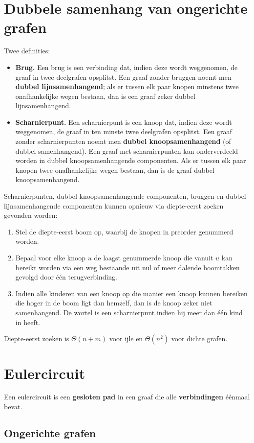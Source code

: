 



\section{Dubbele samenhang van ongerichte grafen}
Twee definities:
\begin{itemize}
	\item \textbf{Brug.} Een brug is een verbinding dat, indien deze wordt weggenomen, de graaf in twee deelgrafen opsplitst. Een graaf zonder bruggen noemt men \textbf{dubbel lijnsamenhangend}; als er tussen elk paar knopen minstens twee onafhankelijke wegen bestaan, dan is een graaf zeker dubbel lijnsamenhangend.
	\item \textbf{Scharnierpunt.} Een scharnierpunt is een knoop dat, indien deze wordt weggenomen, de graaf in ten minste twee deelgrafen opsplitst. Een graaf zonder scharnierpunten noemt men \textbf{dubbel knoopsamenhangend} (of dubbel samenhangend). Een graaf met scharnierpunten kan onderverdeeld worden in dubbel knoopsamenhangende componenten. Als er tussen elk paar knopen twee onafhankelijke wegen bestaan, dan is de graaf dubbel knoopsamenhangend.
\end{itemize}

Scharnierpunten, dubbel knoopsamenhangende componenten, bruggen en dubbel lijnsamenhangende componenten kunnen opnieuw via diepte-eerst zoeken gevonden worden:
\begin{enumerate}
	\item Stel de diepte-eerst boom op, waarbij de knopen in preorder genummerd worden. 
	\item Bepaal voor elke knoop $u$ de laagst genummerde knoop die vanuit $u$ kan bereikt worden via een weg bestaande uit nul of meer dalende boomtakken gevolgd door één terugverbinding. 
	\item Indien alle kinderen van een knoop op die manier een knoop kunnen bereiken die hoger in de boom ligt dan hemzelf, dan is de knoop zeker niet samenhangend. De wortel is een scharnierpunt indien hij meer dan één kind in heeft. 
\end{enumerate}
Diepte-eerst zoeken is $\Theta(n + m)$ voor ijle en $\Theta(n^2)$ voor dichte grafen.
\section{Eulercircuit}
Een eulercircuit is een \textbf{gesloten pad} in een graaf die alle \textbf{verbindingen} éénmaal bevat. 
\subsection{Ongerichte grafen}

